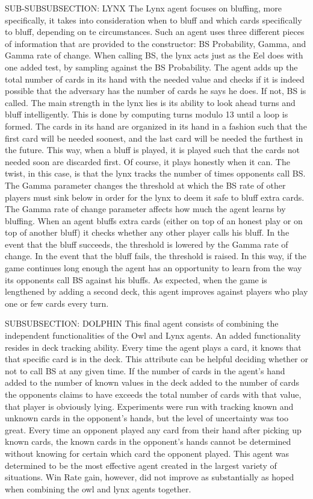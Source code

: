 \documentclass[a4paper,12pt]{article}
\begin{document}
SUB-SUBSUBSECTION: LYNX
	The Lynx agent focuses on bluffing, more specifically, it takes into consideration when to bluff and which cards specifically to bluff, depending on te circumstances. Such an agent uses three different pieces of information that are provided to the constructor: BS Probability, Gamma, and Gamma rate of change. When calling BS, the lynx acts just as the Eel does with one added test, by sampling against the BS Probability. The agent adds up the total number of cards in its hand with the needed value and checks if it is indeed possible that the adversary has the number of cards he says he does. If not, BS is called. 
	The main strength in the lynx lies is its ability to look ahead turns and bluff intelligently. This is done by computing turns modulo 13 until a loop is formed. The cards in its hand are organized in its hand in a fashion such that the first card will be needed soonest, and the last card will be needed the furthest in the future. This way, when a bluff is played, it is played such that the cards not needed soon are discarded first. Of course, it plays honestly when it can. The twist, in this case, is that the lynx tracks the number of times opponents call BS. The Gamma parameter changes the threshold at which the BS rate of other players must sink below in order for the lynx to deem it safe to bluff extra cards. The Gamma rate of change parameter affects how much the agent learns by bluffing. When an agent bluffs extra cards (either on top of an honest play or on top of another bluff) it checks whether any other player calls his bluff. In the event that the bluff succeeds, the threshold is lowered by the Gamma rate of change. In the event that the bluff fails, the threshold is raised. In this way, if the game continues long enough the agent has an opportunity to learn from the way its opponents call BS against his bluffs. As expected, when the game is lengthened by adding a second deck, this agent improves against players who play one or few cards every turn. 

SUBSUBSECTION: DOLPHIN
This final agent consists of combining the independent functionalities of the Owl and Lynx agents. An added functionality resides in deck tracking ability. Every time the agent plays a card, it knows that that specific card is in the deck. This attribute can be helpful deciding whether or not to call BS at any given time. If the number of cards in the agent’s hand added to the number of known values in the deck added to the number of cards the opponents claims to have exceeds the total number of cards with that value, that player is obviously lying. Experiments were run with tracking known and unknown cards in the opponent’s hands, but the level of uncertainty was too great. Every time an opponent played any card from their hand after picking up known cards, the known cards in the opponent’s hands cannot be determined without knowing for certain which card the opponent played. This agent was determined to be the most effective agent created in the largest variety of situations. Win Rate gain, however, did not improve as substantially as hoped when combining the owl and lynx agents together. 
\end{document}
